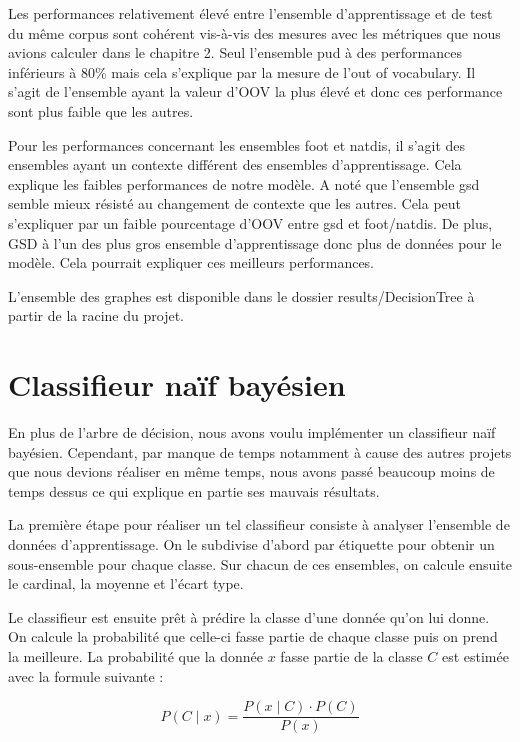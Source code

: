 \documentclass[french, 14pt]{memoir}
\begin{document}
Les performances relativement élevé entre l'ensemble d'apprentissage et de test du même corpus sont cohérent vis-à-vis des mesures avec les métriques que nous avions calculer dans le chapitre 2. Seul l'ensemble pud à des performances inférieurs à 80\% mais cela s'explique par la mesure de l'out of vocabulary. Il s'agit de l'ensemble ayant la valeur d'OOV la plus élevé et donc ces performance sont plus faible que les autres.

Pour les performances concernant les ensembles foot et natdis, il s'agit des ensembles ayant un contexte différent des ensembles d'apprentissage. Cela explique les faibles performances de notre modèle. A noté que l'ensemble gsd semble mieux résisté au changement de contexte que les autres. Cela peut s'expliquer par un faible pourcentage d'OOV entre gsd et foot/natdis. De plus, GSD à l'un des plus gros ensemble d'apprentissage donc plus de données pour le modèle. Cela pourrait expliquer ces meilleurs performances. 

L'ensemble des graphes est disponible dans le dossier results/DecisionTree à partir de la racine du projet.

\section{Classifieur naïf bayésien}

En plus de l'arbre de décision, nous avons voulu implémenter un classifieur naïf bayésien. Cependant, par manque de temps notamment à cause des autres projets que nous devions réaliser en même temps, nous avons passé beaucoup moins de temps dessus ce qui explique en partie ses mauvais résultats.

La première étape pour réaliser un tel classifieur consiste à analyser l'ensemble de données d'apprentissage. On le subdivise d'abord par étiquette pour obtenir un sous-ensemble pour chaque classe. Sur chacun de ces ensembles, on calcule ensuite le cardinal, la moyenne et l'écart type.

Le classifieur est ensuite prêt à prédire la classe d'une donnée qu'on lui donne. On calcule la probabilité que celle-ci fasse partie de chaque classe puis on prend la meilleure. La probabilité que la donnée $x$ fasse partie de la classe $C$ est estimée avec la formule suivante :

\begin{equation}
P(C \mid x) = \frac{P(x \mid C) \cdot P(C)}{P(x)}
\end{equation}
\end{document}
